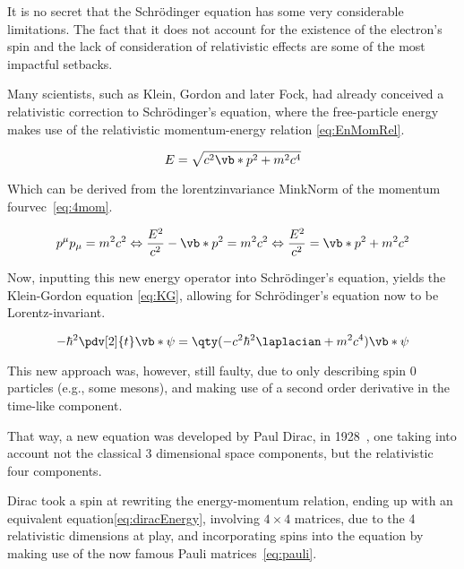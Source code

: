 It is no secret that the Schrödinger equation has some very considerable limitations. The fact that it does not account for the existence of the electron's spin and the lack of consideration of relativistic effects are some of the most impactful setbacks.




Many scientists, such as Klein, Gordon and later Fock, had already conceived a relativistic correction to Schrödinger's equation, where the free-particle energy makes use of the relativistic momentum-energy relation \eqref{eq:EnMomRel}.


 \begin{equation}
    E=\sqrt{c^2\vb*{p}^2+m^2c^4}
    \label{eq:EnMomRel}
 \end{equation}


 Which can be derived from the \gls{lorentzinvariance} \gls{MinkNorm} of the momentum \gls{fourvec}~\eqref{eq:4mom}.


 \begin{equation}
    p^\mu p_\mu = m^2c^2\Leftrightarrow\dfrac{E^2}{c^2}-\vb*{p}^2=m^2c^2 \Leftrightarrow  \dfrac{E^2}{c^2}= \vb*{p}^2 +m^2c^2
    \label{eq:4mom}
\end{equation}

 Now, inputting this new energy operator into Schrödinger's equation, yields the Klein-Gordon equation \eqref{eq:KG}, allowing for Schrödinger's equation now to be Lorentz-invariant.

 \begin{equation}
    -\hbar^2 \pdv[2]{t} \vb*{\psi}=\qty(-c^2\hbar^2\laplacian + m^2c^4)\vb*{\psi}
    \label{eq:KG}
\end{equation}



 This new approach was, however, still faulty, due to only describing spin 0 particles (e.g., some mesons), and making use of a second order derivative in the time-like component.

 That way, a new equation was developed by Paul Dirac, in 1928~\cite{Dirac}, one taking into account not the classical 3 dimensional space components, but the relativistic four components.




 Dirac took a spin at rewriting the energy-momentum relation, ending up with an equivalent equation\eqref{eq:diracEnergy}, involving $4\times 4$ matrices, due to the 4 relativistic dimensions at play, and incorporating spins into the equation by making use of the now famous Pauli matrices~\eqref{eq:pauli}.

